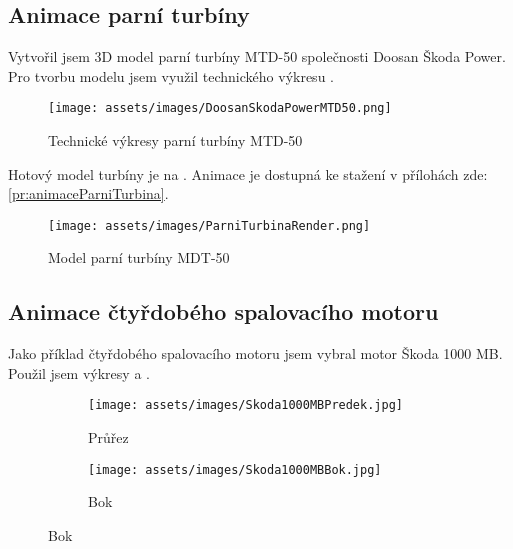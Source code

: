 \newpage

\subsection{Animace parní turbíny}
{Vytvořil jsem 3D model parní turbíny MTD-50 společnosti Doosan Škoda Power. Pro tvorbu modelu jsem využil technického výkresu .}
\cite{SP:ApplicationAspectsOfSteamTurbinesForCombinedHeatAndPowerGeneration}

\begin{figure}[H]
    \centering
    \texttt{[image: assets/images/DoosanSkodaPowerMTD50.png]}
    \caption{Technické výkresy parní turbíny MTD-50 \cite{SP:ApplicationAspectsOfSteamTurbinesForCombinedHeatAndPowerGeneration}}
    \label{obr:DoosanSkodaPowerMTD50}
\end{figure}

{Hotový model turbíny je na . Animace je dostupná ke stažení v přílohách zde: \ref{pr:animaceParniTurbina}.}

\begin{figure}[H]
    \centering
    \texttt{[image: assets/images/ParniTurbinaRender.png]}
    \caption{Model parní turbíny MDT-50 \jaObr}
    \label{obr:ParniTurbinaRender}
\end{figure}

\newpage

\subsection{Animace čtyřdobého spalovacího motoru}
{Jako příklad čtyřdobého spalovacího motoru jsem vybral motor Škoda 1000 MB. Použil jsem výkresy  a .}
\cite{AUTOMOBIL:Skoda1000MBLegendaSlavi60Let}

\begin{figure}[H]
    \centering
    \begin{subfigure}{.5\textwidth}
        \centering
        \texttt{[image: assets/images/Skoda1000MBPredek.jpg]}
        \caption{Průřez}
        \label{obr:1000MBvykresyPrurez}
    \end{subfigure}%
    \begin{subfigure}{.5\textwidth}
        \centering
        \texttt{[image: assets/images/Skoda1000MBBok.jpg]}
        \caption{Bok}
        \label{obr:1000MBvykresyBok}
    \end{subfigure}
\end{figure}

